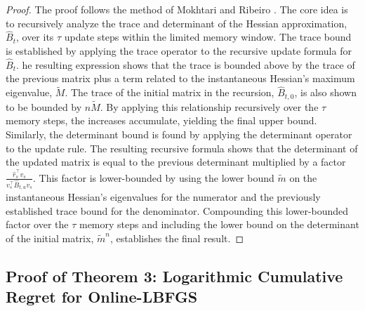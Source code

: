 \documentclass{article}
\theoremstyle{ssltheorem}
\begin{document}
\begin{proof}
The proof follows the method of Mokhtari and Ribeiro \cite{mokhtari2015online}.
The core idea is to recursively analyze the trace and determinant of the Hessian approximation, $\hat{B}_{t}$, over its $\tau$ update steps within the limited memory window.
The trace bound is established by applying the trace operator to the recursive update formula for $\hat{B}_{t}$.
he resulting expression shows that the trace is bounded above by the trace of the previous matrix plus a term related to the instantaneous Hessian's maximum eigenvalue, $\tilde{M}$.
The trace of the initial matrix in the recursion, $\hat{B}_{t,0}$, is also shown to be bounded by $n\tilde{M}$.
By applying this relationship recursively over the $\tau$ memory steps, the increases accumulate, yielding the final upper bound.
Similarly, the determinant bound is found by applying the determinant operator to the update rule.
The resulting recursive formula shows that the determinant of the updated matrix is equal to the previous determinant multiplied by a factor $\frac{\hat{r}_{s}^{\top}v_{s}}{v_{s}^{\top}\hat{B}_{t,u}v_{s}}$.
This factor is lower-bounded by using the lower bound $\tilde{m}$ on the instantaneous Hessian's eigenvalues for the numerator and the previously established trace bound for the denominator.
Compounding this lower-bounded factor over the $\tau$ memory steps and including the lower bound on the determinant of the initial matrix, $\tilde{m}^{n}$, establishes the final result.
\end{proof}

\subsection{Proof of Theorem 3: Logarithmic Cumulative Regret for Online-LBFGS}
\end{document}
